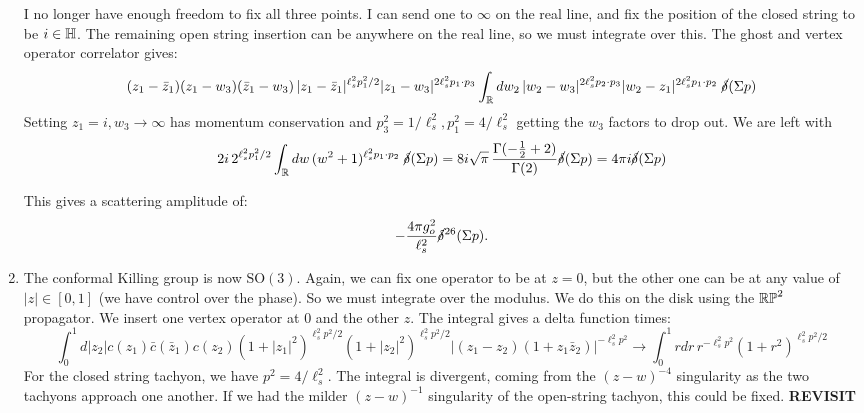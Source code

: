 \documentclass[11pt, class=article, crop=false]{standalone}
\begin{document}
\begin{enumerate}
	 I no longer have enough freedom to fix all three points. I can send one to $\infty$ on the real line, and fix the position of the closed string to be $i \in \mathbb{H}$. The remaining open string insertion can be anywhere on the real line, so we must integrate over this. The ghost and vertex operator correlator gives:
	\[
		(z_1 - \bar z_1) (z_1 - w_3) (\bar z_1 - w_3)\,  |z_1 - \bar z_1|^{\ell_s^2 p_1^2/2} |z_1 - w_3|^{2 \ell_s^2 p_1 \cdot p_3} \int_{\mathbb{R}} dw_2 \, |w_2 - w_3|^{2 \ell_s^2 p_2 \cdot p_3} |w_2 - z_1|^{2 \ell_s^2 p_1 \cdot p_2} \; \cancel\delta(\Sigma p)
	\] 
	Setting $z_1 = i, w_3 \to \infty$ has momentum conservation and $p_3^2 = 1/\ell_s^2, p_1^2 = 4/\ell_s^2$ getting the $w_3$ factors to drop out. We are left with
	\[
		2i \,2^{\ell_s^2 p_1^2/2} \int_{\mathbb{R}} dw \, (w^2 + 1)^{\ell_s^2 p_1 \cdot p_2} \; \cancel\delta(\Sigma p) = 8 i \sqrt\pi \,  \frac{ \Gamma(-\frac12 +2)}{\Gamma(2)} \cancel\delta(\Sigma p) = 4\pi i \cancel\delta(\Sigma p)
	\]

	This gives a scattering amplitude of:
	\[
		-\frac{4 \pi g_o^2}{\ell_s^2}  \cancel\delta^{26}(\Sigma p).
	\]

	\item The conformal Killing group is now $\mathrm{SO}(3)$. Again, we can fix one operator to be at $z = 0$, but the other one can be at any value of $|z| \in [0, 1]$ (we have control over the phase). So we must integrate over the modulus. We do this on the disk using the $\mathbb{RP}^2$ propagator. We insert one vertex operator at $0$ and the other $z$. The integral gives a delta function times: 
	\[
		\int_0^1 d|z_2| c(z_1)\bar c(\bar z_1) c(z_2)  (1+|z_1|^2)^{\ell_s^2 p^2/2} (1+|z_2|^2)^{\ell_s^2 p^2/2} |(z_1 - z_2) (1+z_1 \bar z_2)|^{-\ell_s^2 p^2}\to \int_0^1 r dr\, r^{-\ell_s^2 p^2} (1+r^2)^{\ell_s^2 p^2/2}
	\]
	For the closed string tachyon, we have $p^2 = 4/\ell_s^2$. The integral is divergent, coming from the $(z-w)^{-4}$ singularity as the two tachyons approach one another. If we had the milder $(z-w)^{-1}$ singularity of the open-string tachyon, this could be fixed. 
	\textbf{REVISIT}
	

\end{enumerate}
\end{document}
